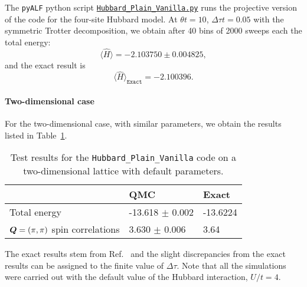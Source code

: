 The \texttt{pyALF} python script   \href{https://git.physik.uni-wuerzburg.de/ALF/pyALF/-/blob/master/Scripts/Hubbard_Plain_Vanilla.py}{\texttt{Hubbard\_Plain\_Vanilla.py}}   runs the projective version of the code for the four-site Hubbard model.  At $\theta t =10$, $\Delta \tau t = 0.05 $ with the symmetric Trotter  decomposition, we obtain after 40 bins of 2000 sweeps each the total energy:   
\begin{equation*}
       \langle  \hat{H}   \rangle = -2.103750  \pm      0.004825,
 \end{equation*}
and the exact result is  
\begin{equation*}
\langle  \hat{H}   \rangle_{\texttt{Exact}}    = -2.100396.
\end{equation*}

\paragraph*{Two-dimensional case}  
For the two-dimensional case,   with similar parameters, we obtain the results listed in Table~\ref{tab:2dplain}.
\begin{table}[h!]
\begin{center}
\begin{tabular}{@{}l l l@{}}
\toprule
             &  QMC  & Exact  \\ \midrule
Total energy & -13.618   $\pm $  0.002 &  -13.6224  \\
 $\boldsymbol{Q}=(\pi,\pi)$ spin correlations &  \phantom{-1}3.630     $ \pm $   0.006     & \phantom{-1}3.64 \\ 
 \bottomrule
\end{tabular}
\caption{Test results for the \texttt{Hubbard\_Plain\_Vanilla} code on a two-dimensional lattice with default parameters.} \label{tab:2dplain}
\end{center}
\end{table}
The exact results stem from Ref.~\cite{Parola91}     and the slight discrepancies from the exact results can be  assigned to the finite value of $\Delta \tau$.  Note that all the simulations were carried out with the default value of the Hubbard interaction, $U/t =4$. 
